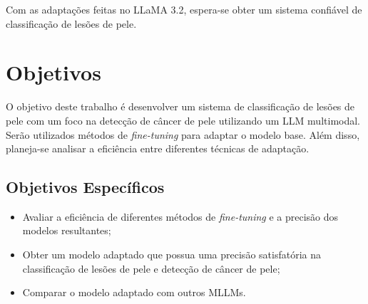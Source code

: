 Com as adaptações feitas no \ac{LLaMA 3.2}, espera-se obter um sistema confiável de classificação de lesões de pele.

\section{Objetivos}

O objetivo deste trabalho é desenvolver um sistema de classificação de lesões de pele com um foco na detecção de câncer de pele utilizando um \ac{LLM} multimodal.
Serão utilizados métodos de \textit{fine-tuning} para adaptar o modelo base. Além disso, planeja-se analisar a eficiência entre diferentes técnicas de adaptação.

\subsection*{Objetivos Específicos}

\begin{itemize}
    \item Avaliar a eficiência de diferentes métodos de \textit{fine-tuning} e a precisão dos modelos resultantes;
    \item Obter um modelo adaptado que possua uma precisão satisfatória na classificação de lesões de pele e detecção de câncer de pele;
    \item Comparar o modelo adaptado com outros \acp{MLLM}.
\end{itemize}
